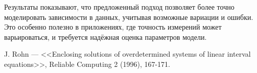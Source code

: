 \documentclass{article}
\begin{document}
  Результаты показывают, что предложенный подход позволяет более точно
  моделировать зависимости в данных, учитывая возможные вариации и ошибки.
  Это особенно полезно в приложениях, где точность измерений может
  варьироваться, и требуется надёжная оценка параметров модели.

  
  

  \begin{thebibliography}{9}
     J. Rohn --- <<Enclosing solutions of overdetermined systems of linear interval equations>>, Reliable Computing 2 (1996), 167-171.
  \end{thebibliography}
\end{document}
